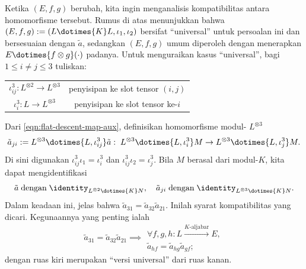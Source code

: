 Ketika $(E,f,g)$ berubah, kita ingin menganalisis kompatibilitas antara
homomorfisme tersebut. Rumus di atas menunjukkan bahwa
$(E,f,g):=(L\dotimes{K}L,\iota_1,\iota_2)$ bersifat ``universal'' untuk
persoalan ini dan bersesuaian dengan $\tilde a$, sedangkan $(E,f,g)$ umum
diperoleh dengan menerapkan $E\dotimes{f\otimes g}(\mathord\cdot)$ padanya.
Untuk menguraikan kasus ``universal'', bagi $1\leq i\neq j\leq3$ tuliskan:
\begin{center}\begin{tabular}{|c|c|} \hline
		$\iota^3_{ij}: L^{\otimes 2} \to L^{\otimes 3}$ & penyisipan ke slot tensor $(i,j)$ \\
		$\iota^3_i: L \to L^{\otimes 3}$ & penyisipan ke slot tensor ke-$i$ \\ \hline
\end{tabular}\end{center}

Dari \eqref{eqn:flat-descent-map-aux}, definisikan homomorfisme modul-
$L^{\otimes3}$
\[ \tilde{a}_{ji} := L^{\otimes 3} \dotimes{L, \iota^3_{ij}}\tilde{a} : \; L^{\otimes 3} \dotimes{L, \iota^3_i} M \to L^{\otimes 3} \dotimes{L, \iota^3_j} M. \]
Di sini digunakan $\iota^3_{ij}\iota_1=\iota^3_i$ dan
$\iota^3_{ij}\iota_2=\iota^3_j$. Bila $M$ berasal dari modul-$K$, kita dapat
mengidentifikasi
\[ \tilde{a} \;\text{dengan}\; \identity_{L^{\otimes 2} \dotimes{K} N}, \quad \tilde{a}_{ji} \;\text{dengan}\; \identity_{L^{\otimes 3} \dotimes{K} N}. \]
Dalam keadaan ini, jelas bahwa
$\tilde a_{31}=\tilde a_{32}\tilde a_{21}$. Inilah syarat kompatibilitas yang
dicari. Kegunaannya yang penting ialah
\begin{equation}\label{eqn:cocycle-condition-descent}
	\tilde{a}_{31} = \tilde{a}_{32} \tilde{a}_{21} \implies
	\begin{array}{l}
		\forall f, g, h: L \xrightarrow{K\text{-aljabar}} E, \\
		\tilde{a}_{hf} = \tilde{a}_{hg} \tilde{a}_{gf};
	\end{array}
\end{equation}
dengan ruas kiri merupakan ``versi universal'' dari ruas kanan.


